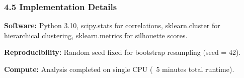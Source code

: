 \subsubsection{4.5 Implementation Details}

\textbf{Software:} Python 3.10, scipy.stats for correlations, sklearn.cluster for hierarchical clustering, sklearn.metrics for silhouette scores.

\textbf{Reproducibility:} Random seed fixed for bootstrap resampling (seed = 42).

\textbf{Compute:} Analysis completed on single CPU (~5 minutes total runtime).

